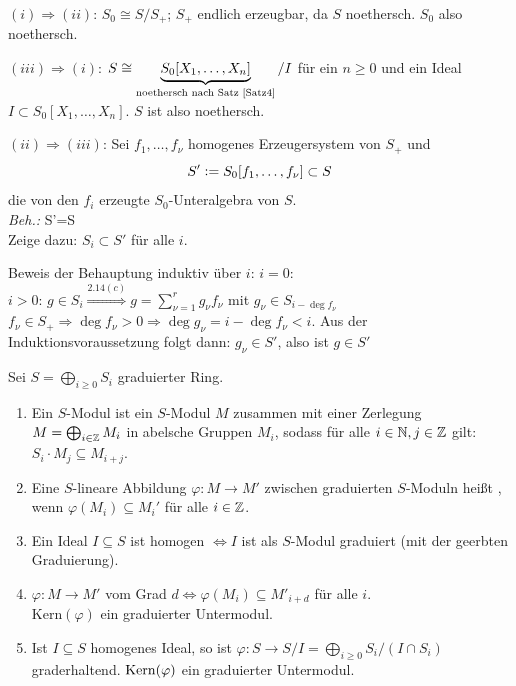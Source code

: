\documentclass[a4paper, 10pt]{report}
\begin{document}
\begin{Bew}
\glqq$(i)\Rightarrow (ii)$\grqq: $S_0\cong S/S_{+}$; $S_{+}$ endlich erzeugbar, da $S$ noethersch.
$S_0$ also noethersch.

\glqq$(iii)\Rightarrow (i)$\grqq: $S\cong \underbrace{S_0[X_1, \ldots, X_n]}_
{\text{noethersch nach Satz \ref{Satz4}}}/I$ f\"ur ein $n\geq 0$
und ein Ideal $I\subset S_0[X_1, \ldots, X_n]$. $S$ ist also noethersch.

\glqq$(ii)\Rightarrow (iii)$\grqq: Sei $f_1, \ldots, f_\nu$ homogenes Erzeugersystem
von $S_+$ und  
\[
S'\mathrel{\mathop:}= S_0[f_1, \ldots, f_\nu]\subset S
\]
die von den $f_i$ erzeugte
$S_0$-Unteralgebra von $S$.\\
\emph{Beh.:} S'=S\\
Zeige dazu: $S_i\subset S'$ f\"ur alle $i$.

Beweis der Behauptung induktiv \"uber $i$:
$i=0$: \chk\\
$i> 0$: $g\in S_i\stackrel{2.14(c)}{\Rightarrow}g=\sum_{\nu=1}^{r} g_{\nu}f_\nu$ mit
$g_\nu\in S_{i-\deg{f_\nu}}$\\
$f_\nu\in S_{+} \Rightarrow \deg{f_\nu}> 0 \Rightarrow \deg{g_\nu}=i-\deg{f_\nu} < i$.
Aus der Induktionsvoraussetzung folgt dann: $g_\nu\in S'$, also ist $g\in S'$
\end{Bew}

\begin{DefBem}
\label{2.16} Sei $S=\bigoplus_{i\geq 0}S_i$ graduierter Ring.
\begin{enumerate}

\item Ein  $S$-Modul ist ein $S$-Modul $M$ zusammen mit
einer Zerlegung $M=\bigoplus_{i\in\mathbb{Z}} M_i$ in abelsche Gruppen $M_i$,
sodass f\"ur alle $i\in\mathbb{N}, j\in\mathbb{Z}$  gilt:
$S_i\cdot M_j\subseteq M_{i+j}$.

\item Eine $S$-lineare Abbildung $\varphi:M\to M'$ zwischen graduierten $S$-Moduln
hei\ss t , wenn $\varphi(M_i)\subseteq
M_i'$ f\"ur alle $i\in \mathbb{Z}$.

\item Ein Ideal $I\subseteq S$ ist homogen $\Leftrightarrow I$ ist als $S$-Modul
graduiert (mit der geerbten Graduierung).

\item $\varphi: M \to M'$ vom Grad $d \Leftrightarrow \varphi(M_i) \subseteq
      M'_{i+d}$ für alle $i$.\\
      Kern$(\varphi)$ ein graduierter Untermodul.
      
\item Ist $I \subseteq S$ homogenes Ideal, so ist $\varphi: S \to S/I =
\bigoplus_{i \ge
0} S_i/(I \cap S_i)$ graderhaltend. $\mathrm{Kern}(\varphi)$ ein graduierter Untermodul.
\end{enumerate}
\end{DefBem}
\end{document}
